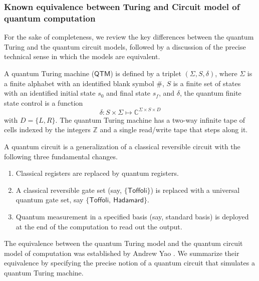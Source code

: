 \documentclass[11pt]{article}
\newcommand{\ms}[1]{\mathsf{#1}}
\begin{document}
\subsubsection{Known equivalence between Turing and Circuit model of quantum computation}
For the sake of completeness, we review the key differences between the quantum Turing and the quantum circuit models, followed by a discussion of the precise technical sense in which the models are equivalent.
\begin{definition}
    A quantum Turing machine ($\mathsf{QTM}$) is defined by a triplet $(\Sigma, S,\delta)$, where $\Sigma$ is a finite alphabet with an identified blank symbol $\#$, $S$ is a finite set of states with an identified initial state $s_0$ and final state $s_f$, and $\delta$, the quantum finite state control is a function 
    \begin{equation}
        \delta: S\times \Sigma \mapsto \mathbb{C}^{\Sigma\times S\times D}
    \end{equation}
    with $D=\{L,R\}$. The quantum Turing machine has a two-way infinite tape of cells indexed by the integers $\mathbb{Z}$ and a single read/write tape that steps along it.
\end{definition}
A quantum circuit is a generalization of a classical reversible circuit with the following three fundamental changes.
\begin{enumerate}
    \item Classical registers are replaced by quantum registers.
    \item A classical reversible gate set (say, $\{\ms{Toffoli}\}$) is replaced with a universal quantum gate set, say $\{ \ms{Toffoli},\ \ms{Hadamard}\}$.
    \item Quantum measurement in a specified basis (say, standard basis) is deployed at the end of the computation to read out the output.
\end{enumerate}

The equivalence between the quantum Turing model and the quantum circuit model of computation was established by Andrew Yao \cite{yao1993quantum}. We summarize their equivalence by specifying the precise notion of a quantum circuit that simulates a quantum Turing machine.

\end{document}
